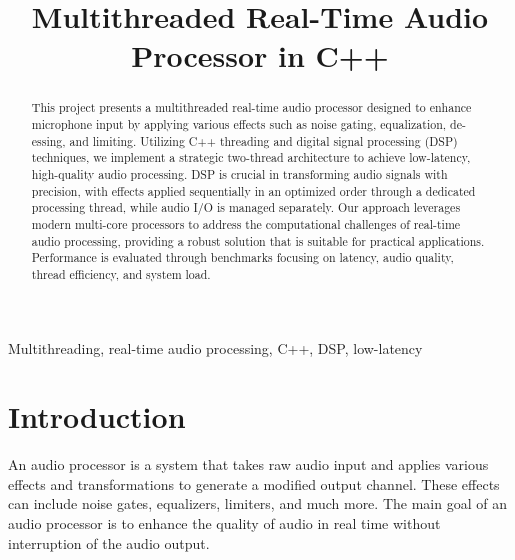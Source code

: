 \documentclass[conference]{IEEEtran}
\begin{document}
\title{Multithreaded Real-Time Audio Processor in C++}

\author{
}

\maketitle

\begin{abstract}
This project presents a multithreaded real-time audio processor designed to enhance microphone input by applying various effects such as noise gating, equalization, de-essing, and limiting. Utilizing C++ threading and digital signal processing (DSP) techniques, we implement a strategic two-thread architecture to achieve low-latency, high-quality audio processing. DSP is crucial in transforming audio signals with precision, with effects applied sequentially in an optimized order through a dedicated processing thread, while audio I/O is managed separately. Our approach leverages modern multi-core processors to address the computational challenges of real-time audio processing, providing a robust solution that is suitable for practical applications. Performance is evaluated through benchmarks focusing on latency, audio quality, thread efficiency, and system load.

\end{abstract}

\begin{IEEEkeywords}
Multithreading, real-time audio processing, C++, DSP, low-latency
\end{IEEEkeywords}

\section{Introduction}

An audio processor is a system that takes raw audio input and applies various effects and transformations to generate a modified output channel. These effects can include noise gates, equalizers, limiters, and much more. The main goal of an audio processor is to enhance the quality of audio in real time without interruption of the audio output.
\end{document}
